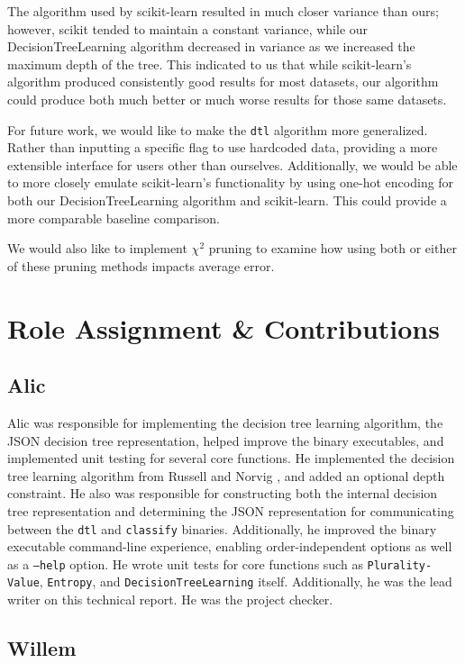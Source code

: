 \documentclass[screen, authorversion, nonacm, sigconf]{acmart}
\begin{document}
The algorithm used by scikit-learn resulted in much closer variance than ours; however, scikit tended to maintain a constant variance, while our DecisionTreeLearning algorithm decreased in variance as we increased the maximum depth of the tree. This indicated to us that while scikit-learn's algorithm produced consistently good results for most datasets, our algorithm could produce both much better or much worse results for those same datasets.

For future work, we would like to make the \texttt{dtl} algorithm more generalized. Rather than inputting a specific flag to use hardcoded data, providing a more extensible interface for users other than ourselves. Additionally, we would be able to more closely emulate scikit-learn's functionality by using one-hot encoding for both our DecisionTreeLearning algorithm and scikit-learn. This could provide a more comparable baseline comparison.

We would also like to implement $\chi^2$ pruning to examine how using both or either of these pruning methods impacts average error.

\section{Role Assignment \& Contributions}

\subsection{Alic}

Alic was responsible for implementing the decision tree learning algorithm, the JSON decision tree representation, helped improve the binary executables, and implemented unit testing for several core functions. He implemented the decision tree learning algorithm from Russell and Norvig \cite{russell_norvig_2010}, and added an optional depth constraint. He also was responsible for constructing both the internal decision tree representation and determining the JSON representation for communicating between the \texttt{dtl} and \texttt{classify} binaries. Additionally, he improved the binary executable command-line experience, enabling order-independent options as well as a \texttt{--help} option. He wrote unit tests for core functions such as \texttt{Plurality-Value}, \texttt{Entropy}, and \texttt{DecisionTreeLearning} itself. Additionally, he was the lead writer on this technical report. He was the project checker.

\subsection{Willem}
\end{document}
